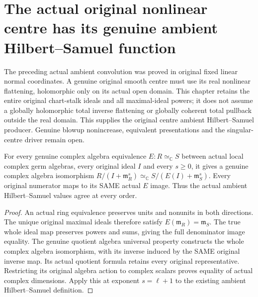 \section{The actual original nonlinear centre has its genuine ambient Hilbert--Samuel function}

The preceding actual ambient convolution was proved in original fixed linear
normal coordinates. A genuine original smooth centre must use its real
nonlinear flattening, holomorphic only on its actual open domain. This chapter
retains the entire original chart-stalk ideals and all maximal-ideal powers;
it does not assume a globally holomorphic total inverse flattening or globally
coherent total pullback outside the real domain. This supplies the original
centre ambient Hilbert--Samuel producer. Genuine blowup nonincrease,
equivalent presentations and the singular-centre driver remain open.

\begin{theorem}
\label{hir:smooth-centre-actual-whole-ambient-jet-transport-whole-parent}
\leanok
For every genuine complex algebra equivalence $E:R\simeq_{\mathbb C}S$
between actual local complex germ algebras, every original ideal $I$ and
every $s\geq0$, it gives a genuine complex algebra isomorphism
$R/(I+\mathfrak m_R^s)\simeq_{\mathbb C}
S/(E(I)+\mathfrak m_S^s)$. Every original numerator maps to its SAME
actual $E$ image. Thus the actual ambient Hilbert--Samuel values agree at
every order.
\end{theorem}
\begin{proof}
An actual ring equivalence preserves units and nonunits in both directions.
The unique original maximal ideals therefore satisfy
$E(\mathfrak m_R)=\mathfrak m_S$. The true whole ideal map preserves powers
and sums, giving the full denominator image equality. The genuine quotient
algebra universal property constructs the whole complex algebra isomorphism,
with its inverse induced by the SAME original inverse map. Its actual
quotient formula retains every original representative. Restricting its
original algebra action to complex scalars proves equality of actual complex
dimensions. Apply this at exponent $s=\ell+1$ to the existing ambient
Hilbert--Samuel definition.
\end{proof}

